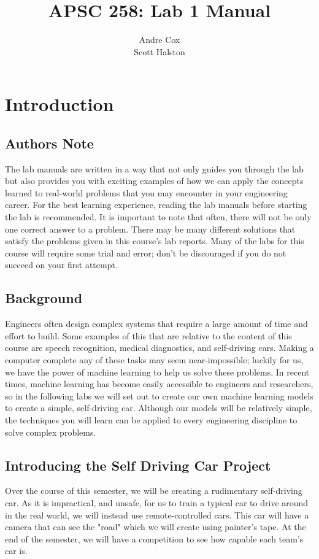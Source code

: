 \documentclass[12pt]{report} %
\title{APSC 258: Lab 1 Manual}
\author{Andre Cox \\ Scott Halston}
\begin{document}
    \maketitle
    \tableofcontents

    \clearpage

    \chapter{Introduction}

    \section{Authors Note}
    The lab manuals are written in a way that not only guides you through the lab but also provides you with exciting examples of how we can apply the concepts learned to real-world problems that you may encounter in your engineering career. For the best learning experience, reading the lab manuals before starting the lab is recommended.
    It is important to note that often, there will not be only one correct answer to a problem. There may be many different solutions that satisfy the problems given in this course's lab reports. Many of the labs for this course will require some trial and error; don't be discouraged if you do not succeed on your first attempt.


    \section{Background}
    Engineers often design complex systems that require a large amount of time and effort to build. Some examples of this that are relative to the content of this course are speech recognition, medical diagnostics, and self-driving cars.
    Making a computer complete any of these tasks may seem near-impossible; luckily for us, we have the power of machine learning to help us solve these problems. In recent times, machine learning has become easily accessible to engineers and researchers, so in the following labs we will set out to create our own machine learning models to create a simple, self-driving car.
    Although our models will be relatively simple, the techniques you will learn can be applied to every engineering discipline to solve complex problems.


    \section{Introducing the Self Driving Car Project}
    Over the course of this semester, we will be creating a rudimentary self-driving car. As it is impractical, and unsafe, for us to train a typical car to drive around in the real world, we will instead use remote-controlled cars. This car will have a camera that can see the "road" which we will create using painter's tape. At the end of the semester, we will have a competition to see how capable each team's car is.
\end{document}
